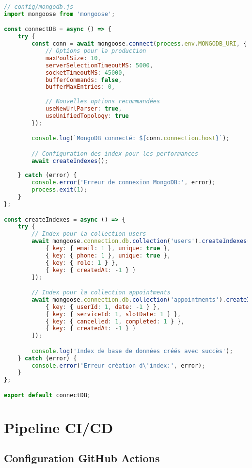\begin{lstlisting}[language=JavaScript, caption=Production database config]
// config/mongodb.js
import mongoose from 'mongoose';

const connectDB = async () => {
    try {
        const conn = await mongoose.connect(process.env.MONGODB_URI, {
            // Options pour la production
            maxPoolSize: 10,
            serverSelectionTimeoutMS: 5000,
            socketTimeoutMS: 45000,
            bufferCommands: false,
            bufferMaxEntries: 0,
            
            // Nouvelles options recommandées
            useNewUrlParser: true,
            useUnifiedTopology: true
        });

        console.log(`MongoDB connecté: ${conn.connection.host}`);

        // Configuration des index pour les performances
        await createIndexes();
        
    } catch (error) {
        console.error('Erreur de connexion MongoDB:', error);
        process.exit(1);
    }
};

const createIndexes = async () => {
    try {
        // Index pour la collection users
        await mongoose.connection.db.collection('users').createIndexes([
            { key: { email: 1 }, unique: true },
            { key: { phone: 1 }, unique: true },
            { key: { role: 1 } },
            { key: { createdAt: -1 } }
        ]);

        // Index pour la collection appointments
        await mongoose.connection.db.collection('appointments').createIndexes([
            { key: { userId: 1, date: -1 } },
            { key: { serviceId: 1, slotDate: 1 } },
            { key: { cancelled: 1, completed: 1 } },
            { key: { createdAt: -1 } }
        ]);

        console.log('Index de base de données créés avec succès');
    } catch (error) {
        console.error('Erreur création d\'index:', error);
    }
};

export default connectDB;
\end{lstlisting}

\section{Pipeline CI/CD}

\subsection{Configuration GitHub Actions}

